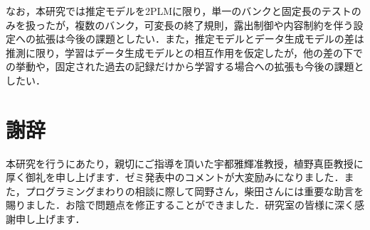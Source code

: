 \documentclass[a4paper,12pt,oneside,openany]{jsbook}
\begin{document}
なお，本研究では推定モデルを2PLMに限り，単一のバンクと固定長のテストのみを扱ったが，複数のバンク，可変長の終了規則，露出制御や内容制約を伴う設定への拡張は今後の課題としたい．また，推定モデルとデータ生成モデルの差は推測に限り，学習はデータ生成モデルとの相互作用を仮定したが，他の差の下での挙動や，固定された過去の記録だけから学習する場合への拡張も今後の課題としたい．

%
\chapter*{謝辞}
本研究を行うにあたり，親切にご指導を頂いた宇都雅輝准教授，植野真臣教授に厚く御礼を申し上げます．ゼミ発表中のコメントが大変励みになりました．また，プログラミングまわりの相談に際して岡野さん，柴田さんには重要な助言を賜りました．お陰で問題点を修正することができました．研究室の皆様に深く感謝申し上げます．
%
%


%
\newpage
\printindex
%
\end{document}
